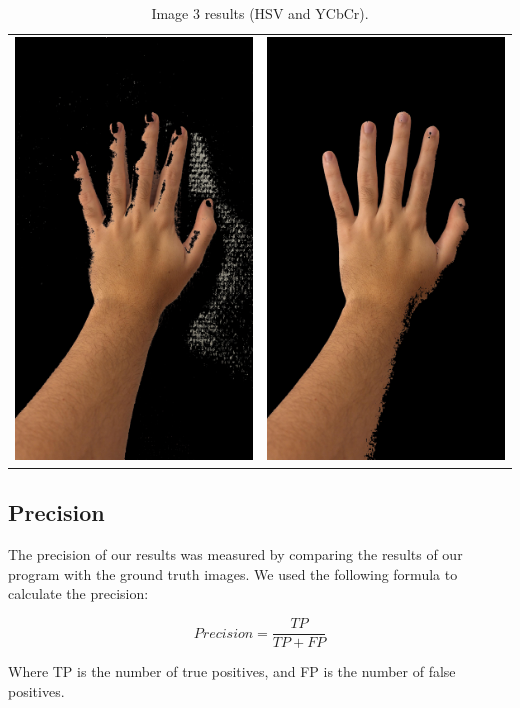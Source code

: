 \documentclass[journal]{IEEEtran}
\begin{document}
\begin{table}[!htbp]
\centering
\begin{tabular}{cc}
    \includegraphics[width=0.3\linewidth]{images/results/hand3_skin_hsv.jpg} & \includegraphics[width=0.3\linewidth]{images/results/hand3_skin_ycc.jpg} \\
\end{tabular}
\caption{Image 3 results (HSV and YCbCr).}
\label{tab:images3}
\end{table}

\subsection{Precision}

The precision of our results was measured by comparing the results of our program with the ground truth images. We used the following formula to calculate the precision:

\begin{equation}
    Precision = \frac{TP}{TP + FP}
\end{equation}

Where TP is the number of true positives, and FP is the number of false positives.
\end{document}
